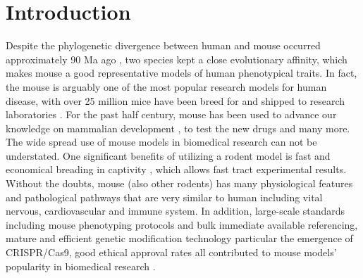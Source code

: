 \section{Introduction}

Despite the phylogenetic divergence between human and mouse occurred approximately 90 Ma ago \cite{Hedges_2006}, two species kept a close evolutionary affinity, which makes mouse a good representative models of human phenotypical traits. In fact, the mouse is arguably one of the most popular research models for human disease, with over 25 million mice have been breed for and shipped to research laboratories \cite{Rosenthal_2007}. For the past half century, mouse has been used to advance our knowledge on mammalian development \cite{Ueda_2006, Cheon_2011}, to test the new drugs \cite{Van_Dam_2011} and many more. The wide spread use of mouse models in biomedical research can not be understated. \cite{MORSEIII_2007} One significant benefits of utilizing a rodent model is fast and economical breading in captivity \cite{Rosenthal_2007}, which allows fast tract experimental results. \cite{Vandamme_2014} Without the doubts, mouse (also other rodents) has many physiological features and pathological pathways that are very similar to human including vital nervous, cardiovascular and immune system. \cite{MORSEIII_2007,Rosenthal_2007} In addition, large-scale standards including mouse phenotyping protocols and bulk immediate available referencing, mature and efficient genetic modification technology \cite{Justice_2011} particular the emergence of CRISPR/Cas9, good ethical approval rates all contributed to mouse models' popularity in biomedical research \cite{26214591, Rosenthal_2007}. 
\\

